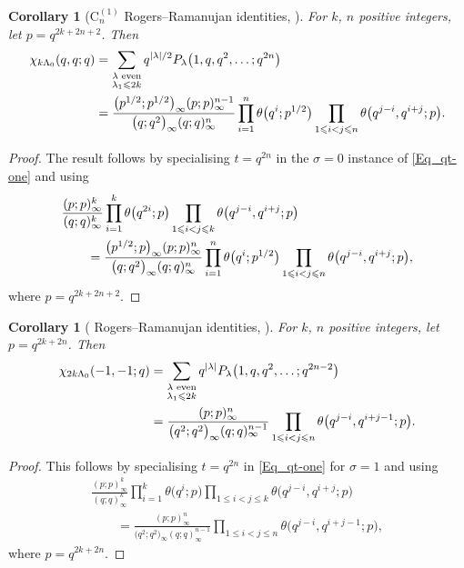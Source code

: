 \documentclass[pdftex]{sigma}
\numberwithin{equation}{section}
\newtheorem{Corollary}[Theorem]{Corollary}
\renewcommand{\leq}{\leqslant}
\newcommand{\abs}[1]{\vert#1\vert}
\newcommand{\la}{\lambda}
\newcommand{\La}{\Lambda}
\begin{document}
\begin{Corollary}[$\mathrm{C}_n^{(1)}$ Rogers--Ramanujan identities,
{\cite[Theorem 1.2]{GOW16}}]%
For $k$, $n$ positive integers, let $p=q^{2k+2n+2}$.
Then
\begin{align}
\chi_{k\La_0}(q,q;q)&=
\sum_{\substack{\la \textup{ even} \\[1pt] \la_1\leq 2k}}
q^{\abs{\la}/2} P_{\la}\bigl(1,q,q^2,\dots;q^{2n}\bigr) \notag \\
&=\frac{\bigl(p^{1/2};p^{1/2}\bigr)_{\infty}(p;p)_{\infty}^{n-1}}
{\bigl(q;q^2\bigr)_{\infty}(q;q)_{\infty}^n}
\prod_{i=1}^n \theta\bigl(q^i;p^{1/2}\bigr)
\prod_{1\leq i<j\leq n} \theta\bigl(q^{j-i},q^{i+j};p\bigr).
\label{Eq_GOW3}
\end{align}
\end{Corollary}

\begin{proof}
The result follows by specialising $t=q^{2n}$ in the $\sigma=0$
instance of \eqref{Eq_qt-one} and using
\begin{align*}
&\frac{(p;p)_{\infty}^k}{(q;q)_{\infty}^k}
\prod_{i=1}^k \theta\bigl(q^{2i};p\bigr)
\prod_{1\leq i<j\leq k} \theta\bigl(q^{j-i},q^{i+j};p\bigr) \notag \\
&\qquad=\frac{\bigl(p^{1/2};p\bigr)_{\infty}(p;p)_{\infty}^n}
{\bigl(q;q^2\bigr)_{\infty}(q;q)_{\infty}^n}
\prod_{i=1}^n \theta\bigl(q^i;p^{1/2}\bigr)
\prod_{1\leq i<j\leq n} \theta\bigl(q^{j-i},q^{i+j};p\bigr),
\end{align*}
where $p=q^{2k+2n+2}$.
\end{proof}

\begin{Corollary}[ Rogers--Ramanujan identities,
{\cite[Theorem 1.2]{GOW16}}]\label{Cor_3}
For $k$, $n$ positive integers, let $p=q^{2k+2n}$.
Then
\begin{align}
\chi_{2k\La_0}(-1,-1;q)&=
\sum_{\substack{\la \textup{ even} \\[1pt] \la_1\leq 2k}}
q^{\abs{\la}} P_{\la}\bigl(1,q,q^2,\dots;q^{2n-2}\bigr) \notag \\
&=\frac{(p;p)_{\infty}^n}{\bigl(q^2;q^2\bigr)_{\infty}(q;q)_{\infty}^{n-1}}
\prod_{1\leq i<j\leq n} \theta\bigl(q^{j-i},q^{i+j-1};p\bigr).
\label{Eq_GOW4}
\end{align}
\end{Corollary}

\begin{proof}
This follows by specialising $t=q^{2n}$ in \eqref{Eq_qt-one} for
$\sigma=1$ and using
\begin{gather}
\frac{(p;p)_{\infty}^k}{(q;q)_{\infty}^k}
\prod_{i=1}^k \theta\bigl(q^i;p\bigr)
\prod_{1\leq i<j\leq k} \theta\bigl(q^{j-i},q^{i+j};p\bigr)\nonumber\\
\qquad{}
=\frac{(p;p)_{\infty}^n}{\bigl(q^2;q^2\bigr)_{\infty}(q;q)_{\infty}^{n-1}}
\prod_{1\leq i<j\leq n} \theta\bigl(q^{j-i},q^{i+j-1};p\bigr),\label{Eq_thetaGOW}
\end{gather}
where $p=q^{2k+2n}$.
\end{proof}
\end{document}
